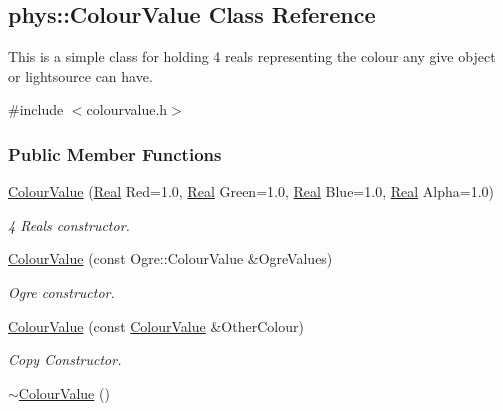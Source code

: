 \hypertarget{classphys_1_1ColourValue}{
\subsection{phys::ColourValue Class Reference}
\label{classphys_1_1ColourValue}
}


This is a simple class for holding 4 reals representing the colour any give object or lightsource can have.  




{\ttfamily \#include $<$colourvalue.h$>$}

\subsubsection*{Public Member Functions}
\begin{DoxyCompactItemize}
\item 
\hyperlink{classphys_1_1ColourValue_aee4faa554b444fe927fa292a794fe74a}{ColourValue} (\hyperlink{namespacephys_af7eb897198d265b8e868f45240230d5f}{Real} Red=1.0, \hyperlink{namespacephys_af7eb897198d265b8e868f45240230d5f}{Real} Green=1.0, \hyperlink{namespacephys_af7eb897198d265b8e868f45240230d5f}{Real} Blue=1.0, \hyperlink{namespacephys_af7eb897198d265b8e868f45240230d5f}{Real} Alpha=1.0)
\begin{DoxyCompactList}\small\item\em 4 Reals constructor. \item\end{DoxyCompactList}\item 
\hyperlink{classphys_1_1ColourValue_ac814df9f1709186fa6aeadbca8e0ed9f}{ColourValue} (const Ogre::ColourValue \&OgreValues)
\begin{DoxyCompactList}\small\item\em Ogre constructor. \item\end{DoxyCompactList}\item 
\hyperlink{classphys_1_1ColourValue_add6b3ac7e9809dce240cd584b94e8c67}{ColourValue} (const \hyperlink{classphys_1_1ColourValue}{ColourValue} \&OtherColour)
\begin{DoxyCompactList}\small\item\em Copy Constructor. \item\end{DoxyCompactList}\item 
\hypertarget{classphys_1_1ColourValue_adc37cfdba61d80ad23765cea5c858751}{
\hyperlink{classphys_1_1ColourValue_adc37cfdba61d80ad23765cea5c858751}{$\sim$ColourValue} ()}
\label{classphys_1_1ColourValue_adc37cfdba61d80ad23765cea5c858751}


\end{DoxyCompactItemize}
